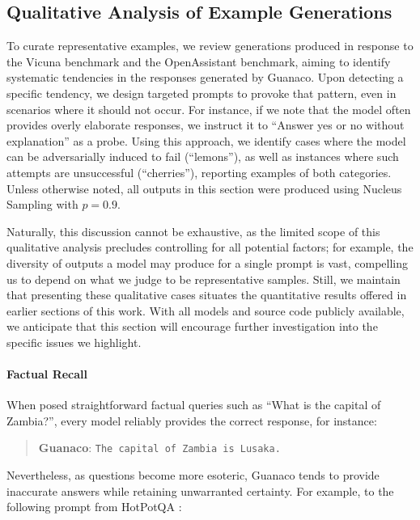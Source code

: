 \subsection{Qualitative Analysis of Example Generations}
\label{ssec:examples}

To curate representative examples, we review generations produced in response to the Vicuna benchmark and the OpenAssistant benchmark, aiming to identify systematic tendencies in the responses generated by {Guanaco}. Upon detecting a specific tendency, we design targeted prompts to provoke that pattern, even in scenarios where it should not occur. For instance, if we note that the model often provides overly elaborate responses, we instruct it to ``Answer yes or no without explanation'' as a probe. Using this approach, we identify cases where the model can be adversarially induced to fail (``lemons''), as well as instances where such attempts are unsuccessful (``cherries''), reporting examples of both categories. Unless otherwise noted, all outputs in this section were produced using Nucleus Sampling \cite{holtzmancurious} with $p=0.9$.

Naturally, this discussion cannot be exhaustive, as the limited scope of this qualitative analysis precludes controlling for all potential factors; for example, the diversity of outputs a model may produce for a single prompt is vast, compelling us to depend on what we judge to be representative samples. Still, we maintain that presenting these qualitative cases situates the quantitative results offered in earlier sections of this work. With all models and source code publicly available, we anticipate that this section will encourage further investigation into the specific issues we highlight.

\paragraph{Factual Recall} When posed straightforward factual queries such as ``What is the capital of Zambia?'', every model reliably provides the correct response, for instance:

\begin{quote} 
    \textbf{Guanaco}:
    \texttt{The capital of Zambia is Lusaka.}
\end{quote}

Nevertheless, as questions become more esoteric, {Guanaco} tends to provide inaccurate answers while retaining unwarranted certainty. For example, to the following prompt from HotPotQA \citep{yang2018hotpotqa}:

